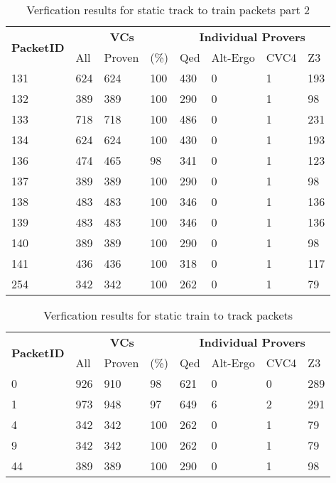 \begin{table}[hbt]
\begin{center}
    \begin{tabular}{|m{10ex}|m{5ex}m{5ex}m{5ex}|m{5ex}m{5ex}m{5ex}m{5ex}|}
\hline
\multirow{2}{*}{\textbf{PacketID}} &
\multicolumn{3}{c|}{ \textbf{VCs}} &
\multicolumn{4}{c|}{\textbf{Individual Provers}}\\
\cline{2-8}
               &  All & Proven & (\%) & Qed & Alt-Ergo & CVC4 & Z3  \\
\hline
\hline
131 & 624 & 624 & 100 & 430 & 0 & 1 & 193\\
\hline
132 & 389 & 389 & 100 & 290 & 0 & 1 & 98\\
\hline
133 & 718 & 718 & 100 & 486 & 0 & 1 & 231\\
\hline
134 & 624 & 624 & 100 & 430 & 0 & 1 & 193\\
\hline
136 & 474 & 465 & 98 & 341 & 0 & 1 & 123\\
\hline
137 & 389 & 389 & 100 & 290 & 0 & 1 & 98\\
\hline
138 & 483 & 483 & 100 & 346 & 0 & 1 & 136\\
\hline
139 & 483 & 483 & 100 & 346 & 0 & 1 & 136\\
\hline
140 & 389 & 389 & 100 & 290 &  0 &  1 & 98\\
\hline
141 & 436 & 436 & 100 & 318 & 0 & 1 & 117\\
\hline
254 & 342 & 342 & 100 &262 & 0 & 1 & 79\\
\hline
\end{tabular}
\end{center}
\caption{\label{tbl:packets-without-niter-tracktotrain-part2} Verfication results for static track to train  packets part 2}
\end{table}

\FloatBarrier  %

\begin{table}[hbt]
\begin{center}
    \begin{tabular}{|m{10ex}|m{5ex}m{5ex}m{5ex}|m{5ex}m{5ex}m{5ex}m{5ex}|}
\hline
\multirow{2}{*}{\textbf{PacketID}} &
\multicolumn{3}{c|}{ \textbf{VCs}} &
\multicolumn{4}{c|}{\textbf{Individual Provers}}\\
\cline{2-8}
               &  All & Proven & (\%) & Qed & Alt-Ergo & CVC4 & Z3  \\
\hline
\hline
0 & 926 & 910 & 98 & 621 & 0 & 0 & 289\\
\hline
1 & 973 & 948 & 97 & 649 & 6 & 2 & 291\\
\hline
4 & 342 & 342 & 100 & 262 & 0 & 1 & 79\\
\hline
9 & 342 & 342 & 100 & 262 & 0 & 1 & 79\\
\hline
44 & 389 & 389 & 100 & 290 & 0 & 1 & 98\\
\hline
\end{tabular}
\end{center}
\caption{\label{tbl:packets-without-niter-traintotrack} Verfication results for static  train to track packets}
\end{table}

